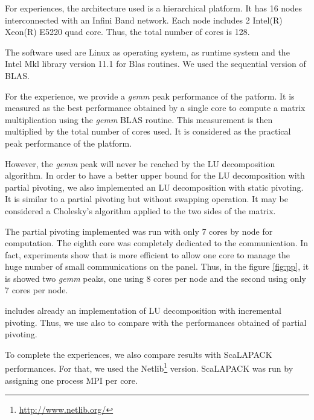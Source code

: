 For experiences, the architecture used is a hierarchical platform. It has 16 nodes interconnected with an Infini Band network. Each node includes  2 Intel(R) Xeon(R) E5220 quad core. Thus, the  total number of cores is 128.

The software used are Linux as operating system, \dague as runtime system and the Intel Mkl library version 11.1 for Blas routines. We used the sequential version of BLAS.

For the experience, we provide a \emph{gemm} peak performance of the patform. It is measured as the best performance obtained by a single core to compute a matrix multiplication using the \emph{gemm} BLAS routine. This measurement is then multiplied by the total number of cores used. It is considered as the practical peak performance of the platform. 

However, the \emph{gemm} peak will never be reached by the LU decomposition algorithm. In order to have a better upper bound for the LU decomposition with partial pivoting, we also implemented an LU decomposition with static pivoting. It is similar to a partial pivoting but without swapping operation. It may be considered a Cholesky's algorithm applied to the two sides of the matrix.


The partial pivoting implemented was run with only 7 cores by node for computation. The eighth core was completely dedicated to the communication. In fact, experiments show that is more efficient to allow one core to manage the huge number of small communications on the panel. Thus, in the figure \ref{fig:pp}, it is showed two \emph{gemm} peaks, one using 8 cores per node and the second using only 7 cores per node.

\dague includes already an implementation of LU decomposition with incremental pivoting. Thus, we use also to compare with the performances obtained of partial pivoting.

To complete the experiences, we also compare results with ScaLAPACK performances. For that, we used the Netlib\footnote{\url{http://www.netlib.org/}} version. ScaLAPACK was run by assigning one process MPI per core.




